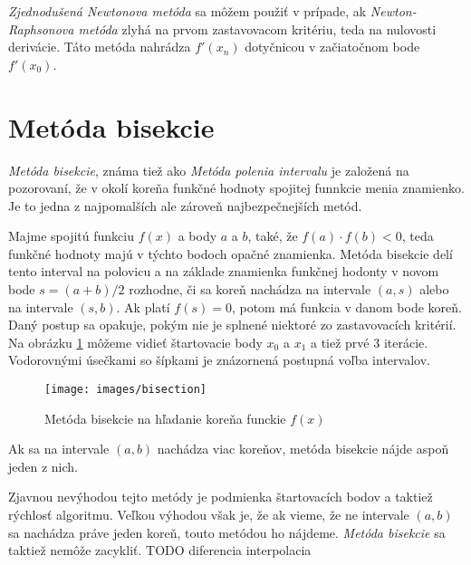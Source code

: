 \textit{Zjednodušená Newtonova metóda} sa môžem použiť v prípade, ak \textit{Newton-Raphsonova metóda} zlyhá na prvom 
zastavovacom kritériu, teda na nulovosti derivácie. Táto metóda nahrádza $f'(x_n)$ dotyčnicou v začiatočnom bode $f'(x_0)$.  
\fi

\section{Metóda bisekcie}

\textit{Metóda bisekcie}, známa tiež ako \textit{Metóda polenia intervalu} je založená 
na pozorovaní, že v okolí koreňa funkčné hodnoty spojitej funnkcie menia znamienko. 
Je to jedna z najpomalších ale zároveň najbezpečnejších metód.

Majme spojitú funkciu $f(x)$ a body $a$ a $b$, také, že $f(a) \cdot f(b) < 0$, teda 
funkčné hodnoty majú v týchto bodoch opačné znamienka. Metóda bisekcie delí tento 
interval na polovicu a na základe znamienka funkčnej hodonty v novom bode $s = (a+b)/2$
rozhodne, či sa koreň nachádza na intervale $(a, s)$ alebo na intervale $(s, b)$. 
Ak platí $f(s) = 0$, potom má funkcia v danom bode koreň. Daný postup sa opakuje, 
pokým nie je splnené niektoré zo zastavovacích kritérií. Na obrázku \ref{obr:bisection}
môžeme vidieť štartovacie body $x_0$ a $x_1$ a tiež prvé 3 iterácie. Vodorovnými
úsečkami so šípkami je znázornená postupná voľba intervalov. 

\begin{figure}
    \centerline{\texttt{[image: images/bisection]}}
    \caption[Metóda bisekcie na hľadanie koreňa funckie $f(x)$]{Metóda bisekcie na hľadanie koreňa funckie $f(x)$}
    \label{obr:bisection}
\end{figure}

Ak sa na intervale $(a, b)$ nachádza viac koreňov, metóda bisekcie nájde aspoň jeden z nich.

Zjavnou nevýhodou tejto metódy je podmienka štartovacích bodov a taktiež rýchlosť algoritmu. 
Veľkou výhodou však je, že ak vieme, že ne intervale $(a, b)$ sa nachádza práve jeden koreň, 
touto metódou ho nájdeme. \textit{Metóda bisekcie} sa taktiež nemôže zacykliť.
TODO
diferencia
interpolacia
